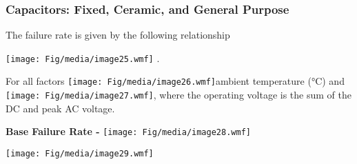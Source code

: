 \subsubsection{Capacitors: Fixed, Ceramic, and General
Purpose}\label{capacitors-fixed-ceramic-and-general-purpose}

The failure rate is given by the following relationship

\texttt{[image: Fig/media/image25.wmf]} .

For all factors \texttt{[image: Fig/media/image26.wmf]}ambient
temperature (°C) and \texttt{[image: Fig/media/image27.wmf]}, where the
operating voltage is the sum of the DC and peak AC voltage.

\textbf{Base Failure Rate -} \texttt{[image: Fig/media/image28.wmf]}

\texttt{[image: Fig/media/image29.wmf]}

